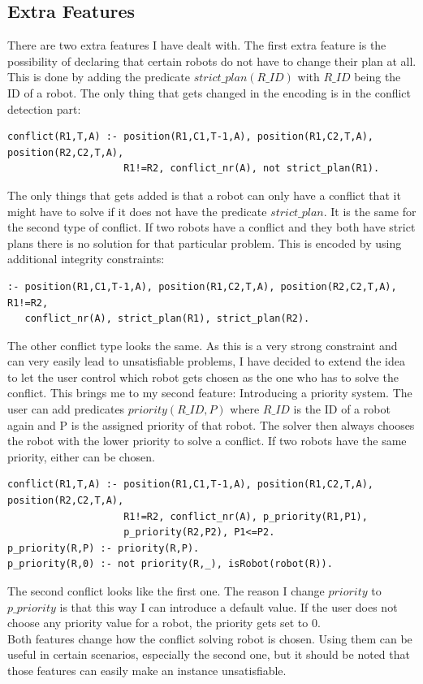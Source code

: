 \documentclass[runningheads]{llncs}
\begin{document}
\subsection{Extra Features}
There are two extra features I have dealt with. The first extra feature is the possibility of declaring that certain robots do not have to change their plan at all.
This is done by adding the predicate $strict\_plan(R\_ID)$ with $R\_ID$ being the ID of a robot. The only thing that gets changed in the encoding is in the conflict detection part:
\begin{verbatim}
conflict(R1,T,A) :- position(R1,C1,T-1,A), position(R1,C2,T,A), position(R2,C2,T,A), 
                    R1!=R2, conflict_nr(A), not strict_plan(R1).
\end{verbatim}
The only things that gets added is that a robot can only have a conflict that it might have to solve if it does not have the predicate $strict\_plan$. It is
the same for the second type of conflict. If two robots have a conflict and they both have strict plans there is no solution for that particular problem. 
This is encoded by using additional integrity constraints:
\begin{verbatim}
:- position(R1,C1,T-1,A), position(R1,C2,T,A), position(R2,C2,T,A), R1!=R2, 
   conflict_nr(A), strict_plan(R1), strict_plan(R2).
\end{verbatim}
The other conflict type looks the same. As this is a very strong constraint and can very easily lead to unsatisfiable problems, I have decided to extend the idea
to let the user control which robot gets chosen as the one who has to solve the conflict. This brings me to my second feature: Introducing a priority system.
The user can add predicates $priority(R\_ID, P)$ where $R\_ID$ is the ID of a robot again and P is the assigned priority of that robot. 
The solver then always chooses the robot with the lower priority to solve a conflict. If two robots have the same priority, either can be chosen. 
\begin{verbatim}
conflict(R1,T,A) :- position(R1,C1,T-1,A), position(R1,C2,T,A), position(R2,C2,T,A), 
                    R1!=R2, conflict_nr(A), p_priority(R1,P1), 
                    p_priority(R2,P2), P1<=P2.
p_priority(R,P) :- priority(R,P).
p_priority(R,0) :- not priority(R,_), isRobot(robot(R)).						
\end{verbatim}
The second conflict looks like the first one. The reason I change $priority$ to $p\_priority$ is that this way I can introduce a default value. If the user does not choose any priority value for a robot,
the priority gets set to 0. \\
Both features change how the conflict solving robot is chosen. Using them can be useful in certain scenarios, especially the second one, but it should be noted that those features can
easily make an instance unsatisfiable.
\end{document}
